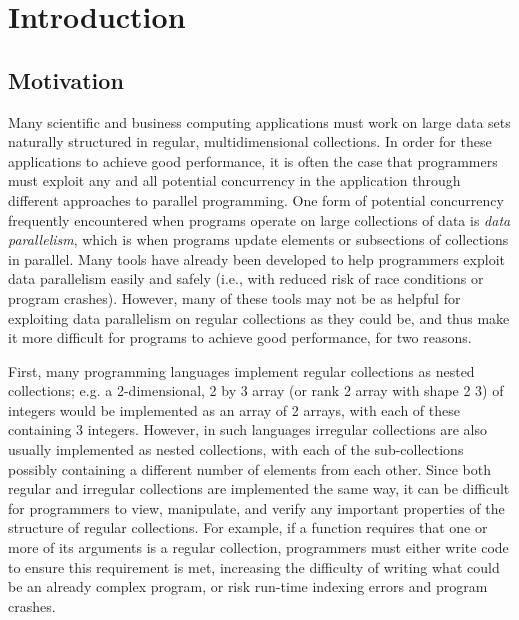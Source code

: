 \chapter{Introduction}

\section{Motivation}
Many scientific and business computing applications must work on large data sets 
naturally structured in regular, multidimensional collections.
In order for these applications to achieve good performance, 
it is often the case that programmers must exploit any and all potential concurrency in the application 
through different approaches to parallel programming.
One form of potential concurrency frequently encountered when programs operate on large collections of data 
is \textit{data parallelism}, which is when programs update elements or subsections of collections in parallel.
Many tools have already been developed to help programmers exploit data parallelism\cite{dph}\cite{openmp}
easily and safely (i.e., with reduced risk of race conditions or program crashes). 
However, many of these tools may not be as helpful 
for exploiting data parallelism on regular collections as they could be, 
and thus make it more difficult for programs to achieve good performance, for two reasons.

First, many programming languages implement regular collections as nested collections;
e.g. a 2-dimensional, 2 by 3 array (or rank 2 array with shape 2 3) of integers would be implemented as 
an array of 2 arrays, with each of these containing 3 integers. 
However, in such languages irregular collections are also usually implemented as nested collections, 
with each of the sub-collections possibly containing a different number of elements from each other.
Since both regular and irregular collections are implemented the same way,
it can be difficult for programmers to view, manipulate, and verify 
any important properties of the structure of regular collections.
For example, if a function requires that one or more of its arguments is a regular collection, 
programmers must either write code to ensure this requirement is met,
increasing the difficulty of writing what could be an already complex program, 
or risk run-time indexing errors and program crashes.

